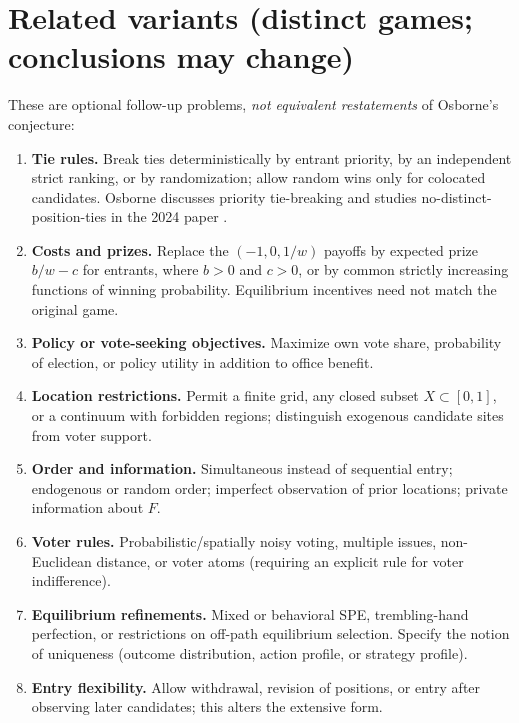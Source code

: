 \documentclass[11pt]{article}
\begin{document}
\section{Related variants (distinct games; conclusions may change)}
These are optional follow-up problems, \emph{not equivalent restatements} of Osborne's conjecture:
\begin{enumerate}[label=\textbf{V\arabic*.}]
\item \textbf{Tie rules.} Break ties deterministically by entrant priority, by an independent strict ranking, or by randomization; allow random wins only for colocated candidates. Osborne discusses priority tie-breaking and studies no-distinct-position-ties in the 2024 paper \cite{OsborneWeb,Osborne2024}.
\item \textbf{Costs and prizes.} Replace the $(-1,0,1/w)$ payoffs by expected prize $b/w-c$ for entrants, where $b>0$ and $c>0$, or by common strictly increasing functions of winning probability. Equilibrium incentives need not match the original game.
\item \textbf{Policy or vote-seeking objectives.} Maximize own vote share, probability of election, or policy utility in addition to office benefit.
\item \textbf{Location restrictions.} Permit a finite grid, any closed subset $X\subset[0,1]$, or a continuum with forbidden regions; distinguish exogenous candidate sites from voter support.
\item \textbf{Order and information.} Simultaneous instead of sequential entry; endogenous or random order; imperfect observation of prior locations; private information about $F$.
\item \textbf{Voter rules.} Probabilistic/spatially noisy voting, multiple issues, non-Euclidean distance, or voter atoms (requiring an explicit rule for voter indifference).
\item \textbf{Equilibrium refinements.} Mixed or behavioral SPE, trembling-hand perfection, or restrictions on off-path equilibrium selection. Specify the notion of uniqueness (outcome distribution, action profile, or strategy profile).
\item \textbf{Entry flexibility.} Allow withdrawal, revision of positions, or entry after observing later candidates; this alters the extensive form.
\end{enumerate}
\end{document}
